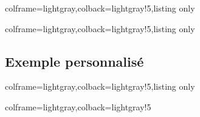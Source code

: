 \documentclass[11pt,a4paper]{ltxdoc}
\begin{document}
\begin{tcblisting}{colframe=lightgray,colback=lightgray!5,listing only}
\def\intlogocardversotrivial{%
  \draw[white] (CARD-LOGO) node[rotate=90,text width=3.75cm,font=\Huge\sffamily,align=left] {{\TeX} \\\hfill{\itshape Pursuit}} ;
}
\end{tcblisting}

\begin{tcblisting}{colframe=lightgray,colback=lightgray!5,listing only}
\def\intlogocardrectotrivial{}
\end{tcblisting}

\subsection{Exemple personnalisé}

\begin{tcblisting}{colframe=lightgray,colback=lightgray!5,listing only}

\def\intlogocardversotrivial{%
  \draw (CARD-LOGO) node[rotate=90]
  {\openmoji[height=2.25cm]{game die}\openmoji[height=2.25cm]{glowing star}} ;
}
\def\intlogocardrectotrivial{%
  \draw (CARD-LOGO) node[opacity=0.05]
  {\openmoji[height=4.25cm]{green apple}} ;
}
\end{tcblisting}

\def\intlogocardversotrivial{%
  \draw (CARD-LOGO) node[rotate=90]
  {\openmoji[height=2.25cm]{game die}\openmoji[height=2.25cm]{glowing star}} ;
}
\def\intlogocardrectotrivial{%
  \draw (CARD-LOGO) node[opacity=0.05]
  {\openmoji[height=4.25cm]{green apple}} ;
}
\begin{tcblisting}{colframe=lightgray,colback=lightgray!5}

\end{tcblisting}
\end{document}
